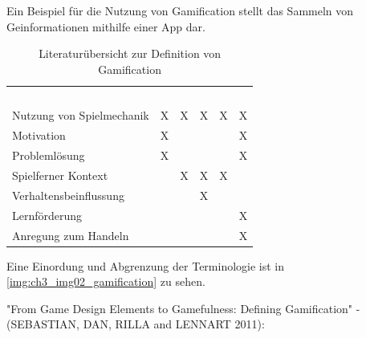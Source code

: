Ein Beispiel für die Nutzung von Gamification stellt das Sammeln von Geinformationen mithilfe einer App dar. \citep{Odobasic.2013}

\begin{table}
\tiny
    \begin{tabular}{llllll}
    ~                         & \cite{Zichermann.2011} & \cite{Deterding.2011} & \cite{Breuer.2011} & \cite{Oxford.2013} & \cite{Kapp.2012} \\
    Nutzung von Spielmechanik & X                             & X                      & X             & X             & X           \\
    Motivation                & X                             & ~                      & ~             & ~             & X           \\
    Problemlösung             & X                             & ~                      & ~             & ~             & X           \\
    Spielferner Kontext       & ~                             & X                      & X             & X             & ~           \\
    Verhaltensbeinflussung    & ~                             & ~                      & X             & ~             & ~           \\
    Lernförderung             & ~                             & ~                      & ~             & ~             & X           \\
    Anregung zum Handeln      & ~                             & ~                      & ~             & ~             & X           \\
    \end{tabular}
    \label{table:ch3:lit_overview}
    \caption{Literaturübersicht zur Definition von Gamification}
\end{table}

Eine Einordung und Abgrenzung der Terminologie ist in \ref{img:ch3_img02_gamification} zu sehen.

"From Game Design Elements to Gamefulness: Defining Gamification" - (SEBASTIAN, DAN, RILLA and LENNART 2011):

